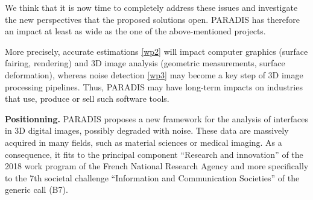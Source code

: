 We think that it is now time to completely address these issues and investigate
the new perspectives that the proposed solutions open. 
PARADIS has therefore an impact at least as wide as the one of the above-mentioned
projects. 

More precisely, accurate estimations \ref{wp2} will impact computer graphics
(surface fairing, rendering) and 3D image analysis (geometric measurements, surface deformation), 
whereas noise detection \ref{wp3} may become a key step of 3D image processing pipelines.  
Thus, PARADIS may have long-term impacts on industries that use, produce or sell such software tools. 


\noindent\textbf{Positionning.}
PARADIS proposes a new framework for the analysis of interfaces in 3D digital images,
possibly degraded with noise. These data are massively acquired in many fields,
such as material sciences or medical imaging. 
As a consequence, it fits to the principal component ``Research and innovation''
of the 2018 work program of the French National Research Agency 
and more specifically to the 7th societal challenge ``Information and Communication Societies''
of the generic call (B7).    




